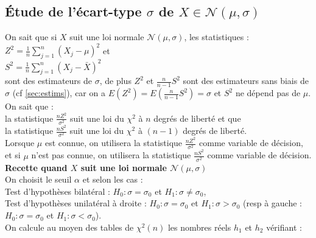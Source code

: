 \documentclass[a4paper,11pt]{book}
\begin{document}
\subsection{\'Etude de l'\'ecart-type $\sigma$ de $X\in \mathcal N(\mu,\sigma)$}
On sait que si $X$ suit une loi normale $\mathcal N(\mu,\sigma)$, les
 statistiques :\\
$\displaystyle Z^2=\frac{1}{n}\sum_{j=1}^n (X_j-\mu)^2$ et \\
$\displaystyle S^2=\frac{1}{n}\sum_{j=1}^n (X_j-\bar X)^2$ \\
sont des estimateurs de $\sigma$, de plus $Z^2$ et  $\frac{n}{n-1}S^2$ sont 
des estimateurs sans biais de $\sigma$ (cf \ref{sec:estims}), car on a 
$E(Z^2)=E(\frac{n}{n-1}S^2)=\sigma$  et $S^2$ ne d\'epend 
pas de $\mu$.\\
On sait  que :\\
la statistique $\displaystyle \frac{nZ^2}{\sigma^2}$ suit 
une loi du $\chi^2$ \`a $n$ degr\'es de libert\'e et que \\
la statistique 
$\displaystyle \frac{nS^2}{\sigma^2}$ suit une loi du $\chi^2$ \`a $(n-1)$ 
degr\'es de libert\'e.\\  
Lorsque $\mu$ est connue, on utilisera la statistique 
$\displaystyle \frac{nZ^2}{\sigma^2}$  comme variable de d\'ecision, et
 si $\mu$ n'est pas connue, on utilisera la statistique 
$\displaystyle \frac{nS^2}{\sigma^2}$ comme variable de d\'ecision.\\
{\bf Recette quand $X$ suit une loi normale $\mathcal N(\mu,\sigma)$}\\ 
On choisit le seuil $\alpha$ et selon les cas :\\
Test d'hypoth\`eses bilat\'eral : $H_0 :\sigma =\sigma_0$ et  $H_1:\sigma \neq \sigma_0$,\\
Test d'hypoth\`eses unilat\'eral \`a droite : $H_0 :\sigma =\sigma_0$ et  $H_1:\sigma > \sigma_0$ (resp  \`a gauche : $H_0 :\sigma =\sigma_0$ et  
$H_1:\sigma < \sigma_0$).\\ 
On calcule au moyen des tables de $\chi^2(n)$
 les nombres r\'eels $h_1$ et $h_2$ v\'erifiant :
\end{document}
